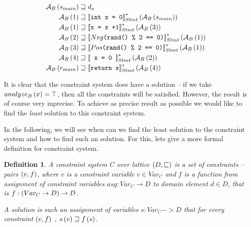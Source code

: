 \documentclass[..thesis.tex]{subfiles}
\newtheorem{defin}{Definition}[section]
\begin{document}
\begin{equation*}
  \begin{split}
    \mathcal{A}_B \left( s_{main} \right) & \sqsupseteq d_s \\
    \mathcal{A}_B \left( 1 \right) & \sqsupseteq \left\llbracket \text{\texttt{int x = 0}} \right\rrbracket_{Stmt}^{*} \left( \mathcal{A}_B \left( s_{main} \right) \right) \\
    \mathcal{A}_B \left( 1 \right) & \sqsupseteq \left\llbracket \text{\texttt{x = x +1}}  \right\rrbracket_{Stmt}^{*} \left( \mathcal{A}_B \left( 3 \right) \right) \\
    \mathcal{A}_B \left( 2 \right) & \sqsupseteq \left\llbracket  \text{\texttt{$Neg$(rand() \% 2 == 0)}}  \right\rrbracket_{Stmt}^{*} \left( \mathcal{A}_B \left( 1 \right) \right) \\
    \mathcal{A}_B \left( 3 \right) & \sqsupseteq \left\llbracket  \text{\texttt{$Pos$(rand() \% 2 == 0)}}  \right\rrbracket_{Stmt}^{*} \left( \mathcal{A}_B \left( 1 \right) \right) \\
    \mathcal{A}_B \left( 4 \right) & \sqsupseteq \left\llbracket \text{\texttt{ x = 0 }} \right\rrbracket_{Stmt}^{*} \left( \mathcal{A}_B \left( 2 \right) \right) \\
    \mathcal{A}_B \left( r_{main} \right)  & \sqsupseteq \left\llbracket  \text{\texttt{return x}}  \right\rrbracket_{Stmt}^{*} \left( \mathcal{A}_B \left( 4 \right) \right)
  \end{split} 
\end{equation*}


It is clear that the constraint system does have a solution -- if we take $analyze_B \left( x \right) = \top$, then all the constraints will be satisfied. However, the result is of course very inprecise. To achieve as precise result as possible we  would like to find the \textit{least} solution to this constraint system. 

In the following, we will see when can we find the least solution to the constraint system and how to find such an solution. For this, lets give a more formal definition for constraint system.

\begin{defin}
A \textit{constraint system} $C$ over lattice $\left( D, \sqsubseteq \right)$ is a set of \textit{constraints} -- pairs $\left( v, f \right)$, where $v$ is a constraint variable $v \in Var_C$ and $f$ is a function from assignment of constraint variables $asg: Var_C \to D$ to domain element $d \in D$, that is $f : \left( Var_C \to D \right) \to D$.

A \textit{solution} is such an assignment of variables $s : Var_C -> D$ that for every constraint $\left( v, f \right)$ , $ s \left( v \right) \sqsupseteq f \left( s \right)$. 
\end{defin}
\end{document}

